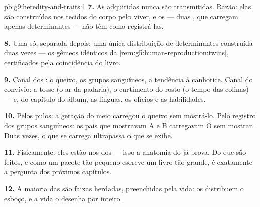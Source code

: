 \begin{solution}{pb:g9:heredity-and-traits:1}
\textbf{7.} As  adquiridas nunca são
transmitidas. Razão: elas são construídas nos tecidos do
corpo pelo viver, e os  --- duas , que
carregam apenas determinantes --- não têm como registrá-las.

\textbf{8.} Uma  só, separada depois: uma única
distribuição de determinantes construída duas vezes --- os
gêmeos idênticos da
\cref{rem:g5:human-reproduction:twins}, certificados pela
coincidência do livro.

\textbf{9.} Canal dos : o queixo, os grupos
sanguíneos, a tendência à canhotice. Canal do convívio: a
tosse (o ar da padaria), o curtimento do rosto (o tempo das
colinas) --- e, do capítulo do álbum, as línguas, os ofícios
e as habilidades.

\textbf{10.} Pelos pulos: a geração do meio carregou o
queixo sem mostrá-lo. Pelo registro dos grupos sanguíneos:
os pais que mostravam A e B carregavam O sem mostrar. Duas
vezes, o que se carrega ultrapassa o que se exibe.

\textbf{11.} Fisicamente: eles estão nos  dos 
--- isso a anatomia do  já prova. Do que são
feitos, e como um pacote tão pequeno escreve um livro tão
grande, é exatamente a pergunta dos próximos capítulos.

\textbf{12.} A maioria das  são faixas
herdadas, preenchidas pela vida: os  distribuem o
esboço, e a vida o desenha por inteiro.
\end{solution}
